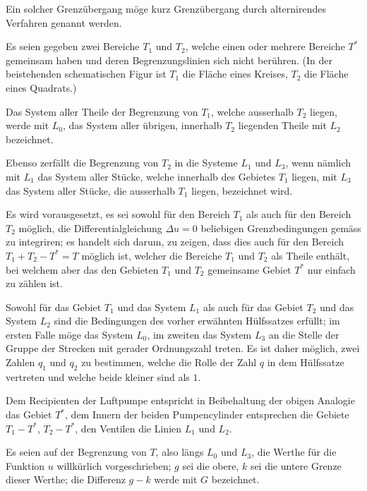 \documentclass{article}
\begin{document}
Ein solcher Grenzübergang möge kurz Grenzübergang durch alternirendes Verfahren genannt werden.


Es seien gegeben zwei Bereiche $T_1$ und $T_2$, welche einen oder mehrere Bereiche $T^*$ gemeinsam haben und deren Begrenzungslinien sich nicht berühren. (In der beistehenden schematischen Figur ist $T_1$ die Fläche eines Kreises, $T_2$ die Fläche eines Quadrats.)

Das System aller Theile der Begrenzung von $T_1$, welche ausserhalb $T_2$ liegen, werde mit $L_0$, das System aller übrigen, innerhalb $T_2$ liegenden Theile mit $L_2$ bezeichnet.

Ebenso zerfällt die Begrenzung von $T_2$ in die Systeme $L_1$ und $L_3$, wenn nämlich mit $L_1$ das System aller Stücke, welche innerhalb des Gebietes $T_1$ liegen, mit $L_3$ das System aller Stücke, die ausserhalb $T_1$ liegen, bezeichnet wird.

Es wird vorausgesetzt, es sei sowohl für den Bereich $T_1$ als auch für den Bereich $T_2$ möglich, die Differentialgleichung $\Delta u = 0$ beliebigen Grenzbedingungen gemäss zu integriren; es handelt sich darum, zu zeigen, dass dies auch für den Bereich $T_1 + T_2 - T^* = T$ möglich ist, welcher die Bereiche $T_1$ und
$T_2$ als Theile enthält, bei welchem aber das den Gebieten $T_1$ und $T_2$ gemeinsame Gebiet $T^*$ nur einfach zu zählen ist.

Sowohl für das Gebiet $T_1$ und das System $L_1$ als auch für das Gebiet $T_2$ und das System $L_2$ sind die Bedingungen des vorher erwähnten Hülfssatzes erfüllt; im ersten Falle möge das System $L_0$, im zweiten das System $L_3$ an die Stelle der Gruppe der Strecken mit gerader Ordnungszahl treten. Es ist daher möglich, zwei Zahlen $q_1$ und $q_2$ zu bestimmen, welche die Rolle der Zahl $q$ in dem Hülfssatze vertreten und welche beide kleiner sind als $1$.

Dem Recipienten der Luftpumpe entspricht in Beibehaltung der obigen Analogie das Gebiet $T^*$, dem Innern der beiden Pumpencylinder entsprechen die Gebiete $T_1 - T^*$, $T_2 - T^*$, den Ventilen die Linien $L_1$ und $L_2$.

Es seien auf der Begrenzung von $T$, also längs $L_0$ und $L_3$, die Werthe für die Funktion $u$ willkürlich vorgeschrieben; $g$ sei die obere, $k$ sei die untere Grenze dieser Werthe; die Differenz $g - k$ werde mit $G$ bezeichnet.
\end{document}
